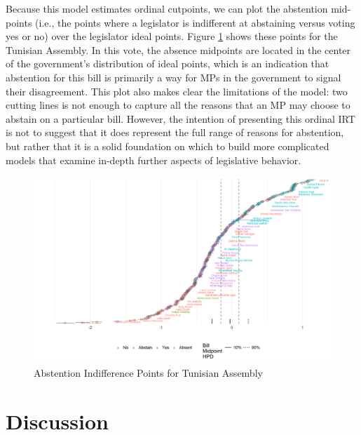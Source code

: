 	Because this model estimates ordinal cutpoints, we can plot the abstention mid-points (i.e., the points where a legislator is indifferent at abstaining versus voting yes or no) over the legislator ideal points. Figure \ref{tunis_abst} shows these points for the Tunisian Assembly. In this vote, the absence midpoints are located in the center of the government's distribution of ideal points, which is an indication that abstention for this bill is primarily a way for MPs in the government to signal their disagreement. This plot also makes clear the limitations of the model: two cutting lines is not enough to capture all the reasons that an MP may choose to abstain on a particular bill. However, the intention of presenting this ordinal IRT is not to suggest that it does represent the full range of reasons for abstention, but rather that it is a solid foundation on which to build more complicated models that examine in-depth further aspects of legislative behavior.
		\begin{figure}
		\centering
		\caption{Abstention Indifference Points for Tunisian Assembly}\label{tunis_abst}
		\includegraphics[width=\linewidth]{tunisia_abstain}
	\end{figure}
	
	\section*{Discussion}
	
